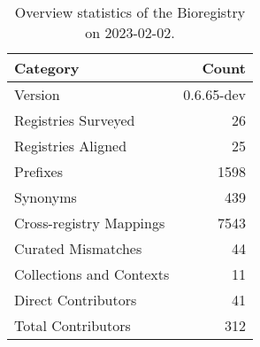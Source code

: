 \begin{table}
\centering
\caption{Overview statistics of the Bioregistry on 2023-02-02.}
\label{tab:bioregistry-summary}
\begin{tabular}{lr}
\toprule
                Category &      Count \\
\midrule
                 Version & 0.6.65-dev \\
     Registries Surveyed &         26 \\
      Registries Aligned &         25 \\
                Prefixes &       1598 \\
                Synonyms &        439 \\
 Cross-registry Mappings &       7543 \\
      Curated Mismatches &         44 \\
Collections and Contexts &         11 \\
     Direct Contributors &         41 \\
      Total Contributors &        312 \\
\bottomrule
\end{tabular}
\end{table}
